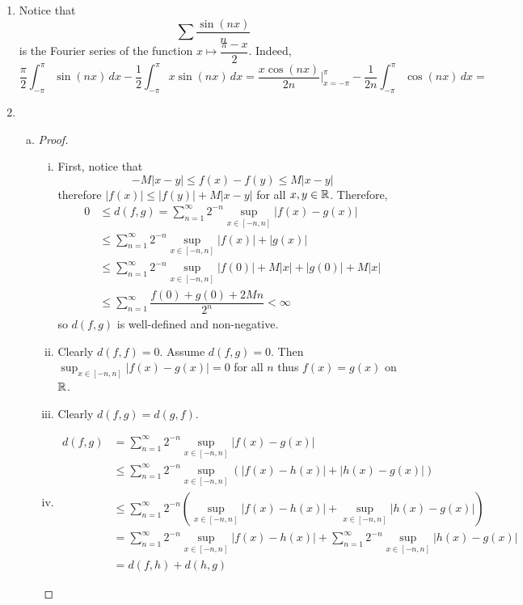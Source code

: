 \begin{enumerate}

\item Notice that
	\[ \sum \dfrac{\sin(nx)}{n} \]
is the Fourier series of the function $x \mapsto \dfrac{\pi -x}{2}$. Indeed,
	\[ \dfrac{\pi}{2}\int_{-\pi}^\pi \sin(nx) \, dx - \dfrac 12 \int_{-\pi}^\pi x \sin(nx) \, dx = 
	\dfrac{x \cos(nx)}{2n}\Bigr|_{x=-\pi}^\pi - \dfrac 1{2n} \int_{-\pi}^\pi  \cos(nx) \, dx = \]

\item \begin{enumerate}[(a)]
	\item \begin{proof}
		\begin{enumerate}[(i)]
			\item First, notice that
				\[ -M|x-y| \le f(x)-f(y) \le M|x-y| \]
			therefore $|f(x)| \le |f(y)| + M|x-y|$ for all $x,y \in \mathbb{R}$. Therefore,
				\begin{align*} 0 &\le d(f,g) = \sum_{n=1}^\infty 2^{-n} \sup_{x \in [-n,n]} |f(x)-g(x)| \\
				&\le \sum_{n=1}^\infty 2^{-n} \sup_{x \in [-n,n]} |f(x)|+|g(x)| \\
				&\le \sum_{n=1}^\infty 2^{-n} \sup_{x \in [-n,n]} |f(0)|+M|x|+|g(0)|+M|x| \\
				&\le \sum_{n=1}^\infty \dfrac{f(0)+g(0)+2Mn}{2^n} < \infty
				\end{align*}
			so $d(f,g)$ is well-defined and non-negative.
			\item Clearly $d(f,f) =0$. Assume $d(f,g)=0$. Then $\sup_{x \in [-n,n]}|f(x)-g(x)|=0$ for all $n$ thus $f(x)=g(x)$ on $\mathbb{R}$.
			\item Clearly $d(f,g)=d(g,f)$.
			\item \begin{align*} d(f,g) &= \sum_{n=1}^\infty 2^{-n} \sup_{x\in[-n,n]} |f(x)-g(x)| \\
				&\le \sum_{n=1}^\infty 2^{-n} \sup_{x\in[-n,n]} \left(|f(x)-h(x)|+|h(x)-g(x)| \right) \\
				&\le \sum_{n=1}^\infty 2^{-n} \left( \sup_{x\in[-n,n]} |f(x)-h(x)| + \sup_{x\in[-n,n]} |h(x)-g(x)| \right) \\
				&= \sum_{n=1}^\infty 2^{-n} \sup_{x\in[-n,n]} |f(x)-h(x)|  + \sum_{n=1}^\infty 2^{-n} \sup_{x\in[-n,n]} |h(x)-g(x)| \\
				&= d(f,h) + d(h,g)
			\end{align*}
		\end{enumerate}
			

\end{proof}
\end{enumerate}
\end{enumerate}

